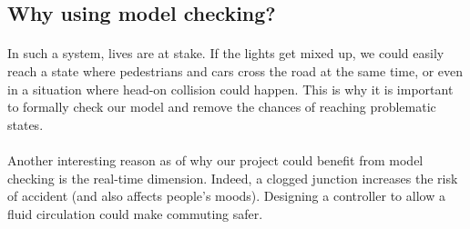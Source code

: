 \documentclass{article}
\begin{document}
\subsection{Why using model checking?}
\paragraph{}
In such a system, lives are at stake. If the lights get mixed up, we could easily reach a state where pedestrians and cars cross the road at the same time, or even in a situation where head-on collision could happen. This is why it is important to formally check our model and remove the chances of reaching problematic states.
\paragraph{}
Another interesting reason as of why our project could benefit from model checking is the real-time dimension. Indeed, a clogged junction increases the risk of accident (and also affects people's moods). Designing a controller to allow a fluid circulation could make commuting safer.
\end{document}
